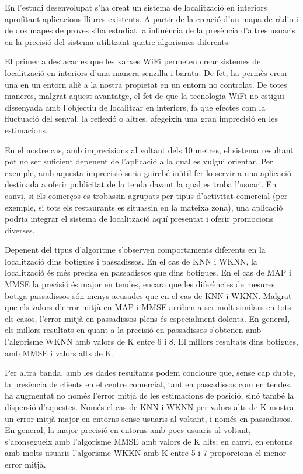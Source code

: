 
En l'estudi desenvolupat s'ha creat un sistema de localització en interiors aprofitant aplicacions lliures existents. A partir de la creació d'un mapa de ràdio i de dos mapes de proves s'ha estudiat la influència de la presència d'altres usuaris en la precisió del sistema utilitzant quatre algorismes diferents.

El primer a destacar es que les xarxes WiFi permeten crear sistemes de localització en interiors d'una manera senzilla i barata. De fet, ha permès crear una en un entorn aliè a la nostra propietat en un entorn no controlat. De totes maneres, malgrat aquest avantatge, el fet de que la tecnologia WiFi no estigui dissenyada amb l'objectiu de localitzar en interiors, fa  que efectes com la fluctuació del senyal, la reflexió o altres, afegeixin una gran imprecisió en les estimacions.

En el nostre cas, amb imprecisions al voltant dels 10 metres, el sistema resultant pot no ser suficient depenent de l'aplicació a la qual es vulgui orientar. Per exemple, amb aquesta imprecisió seria gairebé inútil fer-lo servir a una aplicació destinada a oferir publicitat de la tenda davant la qual es troba l'usuari. En canvi, si els comerços es trobassin agrupats per tipus d'activitat comercial (per exemple, si tots els restaurants es situassin en la mateixa zona), una aplicació podria integrar el sistema de localització aquí presentat i oferir promocions diverses.

Depenent del tipus d'algoritme s'observen comportaments diferents en la localització dins botigues i passadissos. En el cas de KNN i WKNN, la localització és més precisa en passadissos que dins botigues. En el cas de MAP i MMSE la precisió és major en tendes, encara que les diferències de mesures botiga-passadissos són menys acusades que en el cas de KNN i WKNN. Malgrat que els valors d'error mitjà en MAP i MMSE arriben a ser molt similars en tots els casos, l'error mitjà en passadissos plens és especialment dolenta. En general, els millors resultats en quant a la precisió en passadissos s'obtenen amb l'algorisme WKNN amb valors de K entre 6 i 8. El millors resultats dins botigues, amb MMSE i valors alts de K.

Per altra banda, amb les dades resultants podem concloure que, sense cap dubte, la presència de clients en el centre comercial, tant en passadissos com en tendes, ha augmentat no només l'error mitjà de les estimacions de posició, sinó també la dispersió d'aquestes. Només el cas de KNN i WKNN per valors alts de K mostra un error mitjà major en entorns sense usuaris al voltant, i només en passadissos. En general, la major precisió en entorns amb pocs usuaris al voltant, s'aconsegueix amb l'algorisme MMSE amb valors de K alts; en canvi, en entorns amb molts usuaris l'algorisme WKKN amb K entre 5 i 7 proporciona el menor error mitjà.
